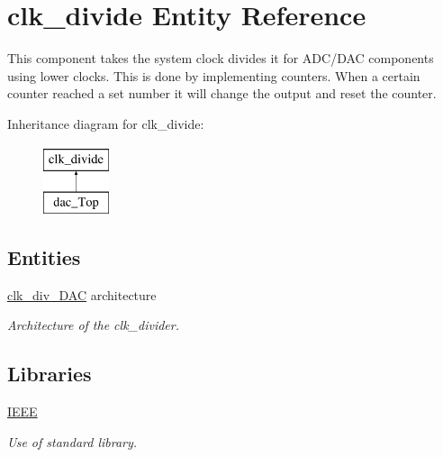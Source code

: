\hypertarget{classclk__divide}{\section{clk\-\_\-divide Entity Reference}
\label{classclk__divide}
}


This component takes the system clock divides it for A\-D\-C/\-D\-A\-C components using lower clocks. This is done by implementing counters. When a certain counter reached a set number it will change the output and reset the counter.  


Inheritance diagram for clk\-\_\-divide\-:\begin{figure}[H]
\begin{center}
\leavevmode
\includegraphics[height=2.000000cm]{classclk__divide}
\end{center}
\end{figure}
\subsection*{Entities}
\begin{DoxyCompactItemize}
\item 
\hyperlink{classclk__divide_1_1clk__div__DAC}{clk\-\_\-div\-\_\-\-D\-A\-C} architecture
\begin{DoxyCompactList}\small\item\em Architecture of the clk\-\_\-divider. \end{DoxyCompactList}\end{DoxyCompactItemize}
\subsection*{Libraries}
 \begin{DoxyCompactItemize}
\item 
\hypertarget{classclk__divide_ae4f03c286607f3181e16b9aa12d0c6d4}{\hyperlink{classclk__divide_ae4f03c286607f3181e16b9aa12d0c6d4}{I\-E\-E\-E} }\label{classclk__divide_ae4f03c286607f3181e16b9aa12d0c6d4}

\begin{DoxyCompactList}\small\item\em Use of standard library. \end{DoxyCompactList}\end{DoxyCompactItemize}
